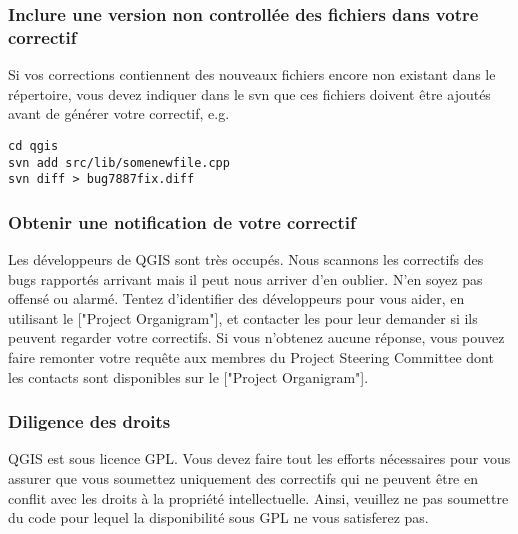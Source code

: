 \subsubsection{Inclure une version non controllée des fichiers dans votre correctif}
Si vos corrections contiennent des nouveaux fichiers encore non existant dans le répertoire, vous devez indiquer dans le svn que ces fichiers doivent être ajoutés avant de générer votre correctif, e.g.

\begin{verbatim}
cd qgis
svn add src/lib/somenewfile.cpp
svn diff > bug7887fix.diff
\end{verbatim}

\subsubsection{Obtenir une notification de votre correctif}
Les développeurs de QGIS sont très occupés. Nous scannons les correctifs des bugs rapportés arrivant mais il peut nous arriver d'en oublier. N'en soyez pas offensé ou alarmé. Tentez d'identifier des développeurs pour vous aider, en utilisant le ["Project Organigram"], et contacter les pour leur demander si ils peuvent regarder votre correctifs. Si vous n'obtenez aucune réponse, vous pouvez faire remonter votre requête aux membres du Project Steering Committee dont les contacts sont disponibles sur le ["Project Organigram"].

\subsubsection{Diligence des droits}
QGIS est sous licence GPL. Vous devez faire tout les efforts nécessaires pour vous assurer que vous soumettez uniquement des correctifs qui ne peuvent être en conflit avec les droits à la propriété intellectuelle. Ainsi, veuillez ne pas soumettre du code pour lequel la disponibilité sous GPL ne vous satisferez pas.


